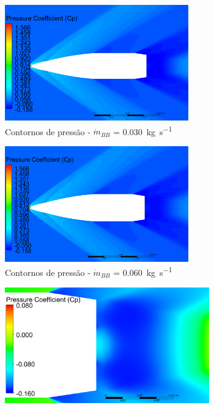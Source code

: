 \begin{figure}[!htpb]
	\centering
	\begin{subfigure}[b]{0.47\textwidth} %
        \centering
        \includegraphics[height=5cm,width=\textwidth]{contorno-pressao-1500-vazao-0030-2pol.png}
        \caption{Contornos de pressão - \(\Dot{m}_{BB}\) = \qty{0,030}{\kilogram\per\second}}
        \label{fig:contorno-pressao-bb-1500K-vazao0030}
    \end{subfigure}
    \hfill
    \begin{subfigure}[b]{0.47\textwidth} %
        \centering
        \includegraphics[height=5cm,width=\textwidth]{contorno-pressao-1500-vazao-0060-2pol.png}
        \caption{Contornos de pressão - \(\Dot{m}_{BB}\) = \qty{0,060}{\kilogram\per\second}}
        \label{fig:contorno-pressao-bb-1500K-vazao0060}
    \end{subfigure}
    \hfill
    \begin{subfigure}[b]{0.47\textwidth} %
        \centering
        \includegraphics[height=5cm,width=\textwidth]{coeficientepressao-vazao0030-temp1500-diam2pol.png}

\end{subfigure}
\end{figure}
